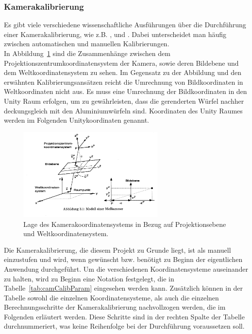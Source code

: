\subsubsection{Kamerakalibrierung}\label{sec:camCalib}

Es gibt viele verschiedene wissenschaftliche Ausführungen über die Durchführung einer Kamerakalibrierung, wie z.B. \cite{5982395}, \cite{888718} und \cite{faugeras1993three}. Dabei unterscheidet man häufig zwischen automatischen und manuellen Kalibrierungen. \\
In Abbildung~\ref{fig:cameraCalib} sind die Zusammenhänge zwischen dem Projektionszentrumkoordinatensystem der Kamera, sowie deren Bildebene und dem Weltkoordinatensystem zu sehen. Im Gegensatz zu der Abbildung und den erwähnten Kalibrierungsansätzen reicht die Umrechnung von Bildkoordinaten in Weltkoordinaten nicht aus. Es muss eine Umrechnung der Bildkoordinaten in den Unity Raum erfolgen, um zu gewährleisten, dass die gerenderten Würfel nachher deckungsgleich mit den Aluminiumwürfeln sind. Koordinaten des Unity Raumes werden im Folgenden Unitykoordinaten genannt.\\

\begin{figure}[H]
		\centering
		\includegraphics[width=0.65\textwidth , trim = 0mm 65mm 270mm 0mm, clip]{Bilder/cameraCalib.jpg}
			\caption{Lage des Kamerakoordinatensystems in Bezug auf Projektionsebene und Weltkoordinatensystem. \cite{Meisel:77890}}
			\label{fig:cameraCalib}
	\end{figure}

Die Kamerakalibrierung, die diesem Projekt zu Grunde liegt, ist als manuell einzustufen und wird, wenn gewünscht bzw. benötigt zu Beginn der eigentlichen Anwendung durchgeführt. Um die verschiedenen Koordinatensysteme auseinander zu halten, wird zu Beginn eine Notation festgelegt, die in Tabelle~\ref{tab:camCalibParam} eingesehen werden kann. Zusätzlich können in der Tabelle sowohl die einzelnen Koordinatensysteme, als auch die einzelnen Berechnungsschritte der Kamerakalibrierung nachvollzogen werden, die im Folgenden erläutert werden. Diese Schritte sind in der rechten Spalte der Tabelle durchnummeriert, was keine Reihenfolge bei der Durchführung voraussetzen soll.\\


